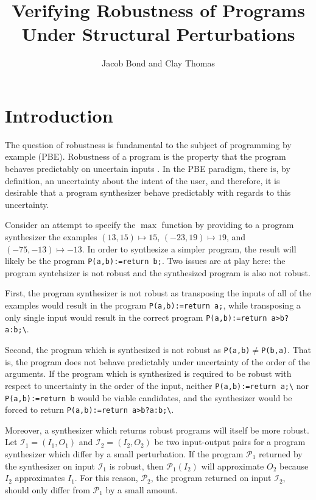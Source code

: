 \documentclass{llncs}
\title{Verifying Robustness of Programs Under Structural Perturbations}
\author{Jacob Bond and Clay Thomas}
\institute{Purdue University}
\begin{document}
\maketitle 


\section{Introduction}

The question of robustness is fundamental to the subject of programming by example (PBE).  Robustness of a program is the property that the program behaves predictably on uncertain inputs \cite{chaudhuri12}.  In the PBE paradigm, there is, by definition, an uncertainty about the intent of the user, and therefore, it is desirable that a program synthesizer behave predictably with regards to this uncertainty.

Consider an attempt to specify the \(\max\) function by providing to a program synthesizer the examples \((13, 15) \mapsto 15\), \((-23, 19) \mapsto 19\), and \((-75, -13) \mapsto -13\).  In order to synthesize a simpler program, the result will likely be the program \verb!P(a,b):=return b;!.  Two issues are at play here: the program syntehsizer is not robust and the synthesized program is also not robust.

First, the program synthesizer is not robust as transposing the inputs of all of the examples would result in the program \verb!P(a,b):=return a;!, while transposing a only single input would result in the correct program \verb!P(a,b):=return a>b?a:b;\!.

Second, the program which is synthesized is not robust as \verb!P(a,b)!\(\not=\)\verb!P(b,a)!.  That is, the program does not behave predictably under uncertainty of the order of the arguments.  If the program which is synthesized is required to be robust with respect to uncertainty in the order of the input, neither \verb!P(a,b):=return a;\! nor \verb!P(a,b):=return b! would be viable candidates, and the synthesizer would be forced to return \verb!P(a,b):=return a>b?a:b;\!.

Moreover, a synthesizer which returns robust programs will itself be more robust.  Let \(\mathcal{I}_{1} = (I_{1}, O_{1})\) and \(\mathcal{I}_{2} = (I_{2}, O_{2})\) be two input-output pairs for a program synthesizer which differ by a small perturbation.  If the program \(\mathcal{P}_{1}\) returned by the synthesizer on input \(\mathcal{I}_{1}\) is robust, then \(\mathcal{P}_{1}(I_{2})\) will approximate \(O_{2}\) because \(I_{2}\) approximates \(I_{1}\).  For this reason, \(\mathcal{P}_{2}\), the program returned on input \(\mathcal{I}_{2}\), should only differ from \(\mathcal{P}_{1}\) by a small amount.
\end{document}
